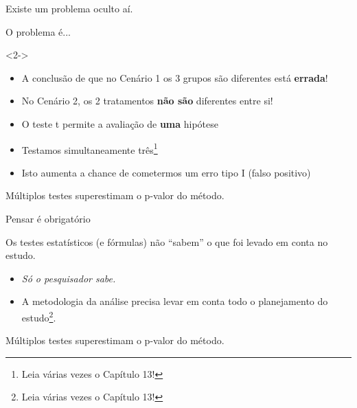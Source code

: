 \documentclass{beamer}
\begin{document}
\begin{frame}{}
  \begin{center}
    Existe um problema oculto aí.
  \end{center}
\end{frame}

\begin{frame}{}
  \begin{center}
    O problema é...
  \end{center}
  \begin{block}{}<2->
    \begin{itemize}
      \footnotesize
    \item A conclusão de que no Cenário 1 os 3 grupos são diferentes está {\bf errada}!
    \item No Cenário 2, os 2 tratamentos {\bf não são} diferentes entre si!
    \end{itemize}
  \end{block}
  \bigskip
  \begin{itemize}
    \scriptsize
  \item<3-> O teste t permite a avaliação de {\bf uma} hipótese
  \item<3-> Testamos simultaneamente três\footnote{Leia várias vezes o Capítulo 13!}
  \item<3-> Isto aumenta a chance de cometermos um erro tipo I (falso positivo)
  \end{itemize}
  \vfill
  \begin{block}{}
    Múltiplos testes superestimam o p-valor do método.
  \end{block}
\end{frame}

\begin{frame}{\small Pensar é obrigatório}
  \begin{block}{}
    \small
    Os testes estatísticos (e fórmulas) não ``sabem'' o que foi levado em conta no estudo.
  \end{block}
  \bigskip
  \bigskip
  \begin{itemize}
    \small
  \item {\em Só o pesquisador sabe.}
  \item A metodologia da análise precisa levar em conta todo o planejamento do estudo\footnote{Leia várias vezes o Capítulo 13!}.
  \end{itemize}
  \bigskip
  \bigskip
  \bigskip
  \begin{block}{}
    Múltiplos testes superestimam o p-valor do método.
  \end{block}
\end{frame}
\end{document}
